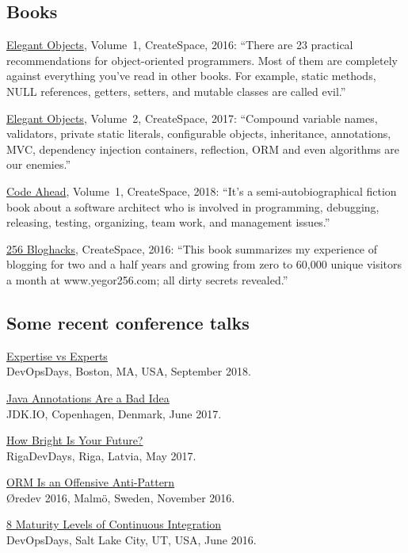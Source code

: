 \documentclass[12pt]{article}
\begin{document}
\subsection*{Books}

\href{https://amzn.to/2E5UHqZ}{Elegant Objects}, Volume~1, CreateSpace, 2016:
``There are 23 practical recommendations for object-oriented programmers. Most of them are completely
against everything you've read in other books.
For example, static methods, NULL references, getters, setters, and
mutable classes are called evil.''

\href{https://amzn.to/2J2s5T4}{Elegant Objects}, Volume~2, CreateSpace, 2017:
``Compound variable names, validators, private static literals, configurable objects, inheritance,
annotations, MVC, dependency injection containers, reflection, ORM and even algorithms are our enemies.''

\href{https://amzn.to/2u9BbqF}{Code Ahead}, Volume~1, CreateSpace, 2018:
``It's a semi-autobiographical fiction book about a software architect
who is involved in programming, debugging, releasing, testing,
organizing, team work, and management issues.''

\href{https://amzn.to/2GkuyXf}{256 Bloghacks}, CreateSpace, 2016:
``This book summarizes my experience of blogging for two and a half years and growing from zero to 60,000
unique visitors a month at www.yegor256.com; all dirty secrets revealed.''

\subsection*{Some recent conference talks}

\href{https://youtu.be/KCx1o_lSMkI}{Expertise vs Experts}\\
DevOpsDays, Boston, MA, USA, September 2018.

\href{https://youtu.be/cv23Z6xpwDw}{Java Annotations Are a Bad Idea}\\
JDK.IO, Copenhagen, Denmark, June 2017.

\href{https://www.youtube.com/watch?v=IGbteQpTNCA}{How Bright Is Your Future?}\\
RigaDevDays, Riga, Latvia, May 2017.

\href{https://www.youtube.com/watch?v=03PXmPc7Q3g}{ORM Is an Offensive Anti-Pattern}\\
\O{}redev 2016, Malm\"o, Sweden, November 2016.

\href{https://www.youtube.com/watch?v=3dJP_LtUGgg}{8 Maturity Levels of Continuous Integration}\\
DevOpsDays, Salt Lake City, UT, USA, June 2016.
\end{document}
